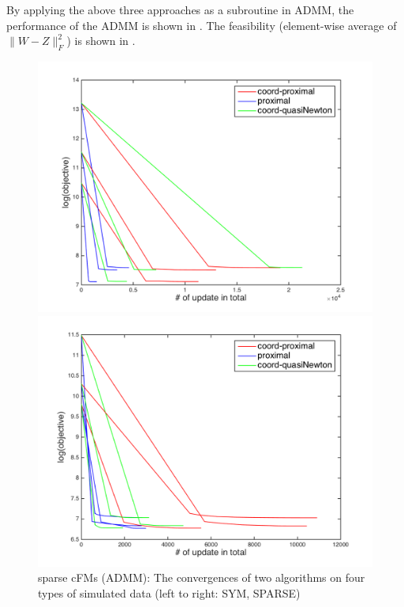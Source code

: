 \documentclass{article}
\begin{document}
By applying the above three approaches as a subroutine in ADMM, the performance of the ADMM is shown in . The feasibility (element-wise average of $\|W - Z\|_F^2$) is shown in .
\begin{figure}[ht!]
  \centering
  \begin{minipage}{0.45\textwidth}
    \centering
    \includegraphics[width=.6\textwidth]{../yanyu_code/plots/sym_ADMM_obj_p30}
  \end{minipage}
  \hfill
  \begin{minipage}{0.45\textwidth}
    \centering
    \includegraphics[width=.6\textwidth]{../yanyu_code/plots/sparse_ADMM_obj_p30}
  \end{minipage}
  \caption{sparse cFMs (ADMM): The convergences of two algorithms on four types of simulated data (left to right: SYM, SPARSE)}
  \label{fig:admm}
\end{figure}
\end{document}
